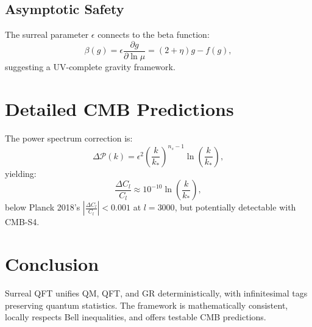 \documentclass{article}
\begin{document}
\subsection{Asymptotic Safety}
The surreal parameter \(\epsilon\) connects to the beta function:
\begin{equation}
\beta(g) = \epsilon \frac{\partial g}{\partial \ln \mu} = (2 + \eta)g - f(g),
\end{equation}
suggesting a UV-complete gravity framework.

\section{Detailed CMB Predictions}
The power spectrum correction is:
\begin{equation}
\Delta \mathcal{P}(k) = \epsilon^2 \left( \frac{k}{k_*} \right)^{n_s-1} \ln \left( \frac{k}{k_*} \right),
\end{equation}
yielding:
\begin{equation}
\frac{\Delta C_l}{C_l} \approx 10^{-10} \ln \left( \frac{k}{k_*} \right),
\end{equation}
below Planck 2018's \(\left| \frac{\Delta C_l}{C_l} \right| < 0.001\) at \(l=3000\), but potentially detectable with CMB-S4.

\section{Conclusion}
Surreal QFT unifies QM, QFT, and GR deterministically, with infinitesimal tags preserving quantum statistics. The framework is mathematically consistent, locally respects Bell inequalities, and offers testable CMB predictions.
\end{document}

